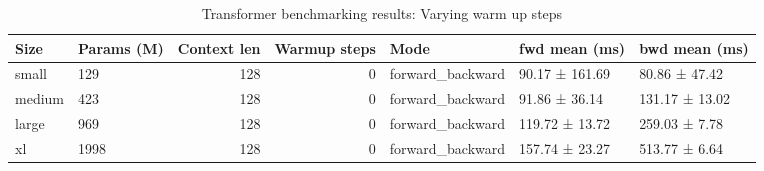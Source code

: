 \begin{table}
\caption{Transformer benchmarking results: Varying warm up steps }
\label{tab:benchmarks}
\begin{tabular}{llrrlll}
\toprule
Size & Params (M) & Context len & Warmup steps & Mode & fwd mean (ms) & bwd mean (ms) \\
\midrule
small & 129 & 128 & 0 & forward_backward & 90.17 ± 161.69 & 80.86 ± 47.42 \\
medium & 423 & 128 & 0 & forward_backward & 91.86 ± 36.14 & 131.17 ± 13.02 \\
large & 969 & 128 & 0 & forward_backward & 119.72 ± 13.72 & 259.03 ± 7.78 \\
xl & 1998 & 128 & 0 & forward_backward & 157.74 ± 23.27 & 513.77 ± 6.64 \\
\bottomrule
\end{tabular}
\end{table}
